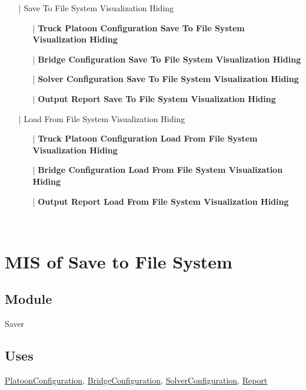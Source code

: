 \documentclass[12pt, titlepage]{article}
\begin{document}
\begin{enumerate}
\begin{enumerate}
\begin{enumerate}
            \begin{itemize}
                \item[|] {Save To File System Visualization Hiding}
                \begin{itemize}
                    \item[|] \textbf{Truck Platoon Configuration Save To File System Visualization Hiding}
                    \item[|] \textbf{Bridge Configuration Save To File System Visualization Hiding}
                    \item[|] \textbf{Solver Configuration Save To File System Visualization Hiding}
                    \item[|] \textbf{Output Report Save To File System Visualization Hiding}
                \end{itemize}
                \item[|] {Load From File System Visualization Hiding}
                \begin{itemize}
                    \item[|] \textbf{Truck Platoon Configuration Load From File System Visualization Hiding}
                    \item[|] \textbf{Bridge Configuration Load From File System Visualization Hiding}
                    \item[|] \textbf{Output Report Load From File System Visualization Hiding}
                \end{itemize}
            \end{itemize}
        \end{enumerate}
    \end{enumerate}
\end{enumerate}

~\newpage

\section{MIS of Save to File System}\label{Saver}

\subsection{Module}

Saver

\subsection{Uses}
\hyperref[PlatoonConfiguration]{PlatoonConfiguration}, \hyperref[BridgeConfiguration]{BridgeConfiguration}, \hyperref[SolverConfiguration]{SolverConfiguration}, \hyperref[Report]{Report}
\end{document}
